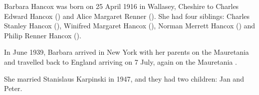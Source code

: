 
Barbara Hancox was born on 25 April 1916 in Wallasey, Cheshire to Charles Edward Hancox () and Alice Margaret Renner ()\cite{BarbaraHancoxBirth}.  She had four siblings: Charles Stanley Hancox (), Winifred Margaret Hancox (), Norman Merrett Hancox () and Philip Renner Hancox ().

In June 1939, Barbara arrived in New York with her parents on the Mauretania  and travelled back to England arriving on 7 July, again on the Mauretania \cite{BarbaraHancoxTravel}.

She married Stanislaus Karpinski in 1947, and they had two children: Jan and Peter.

